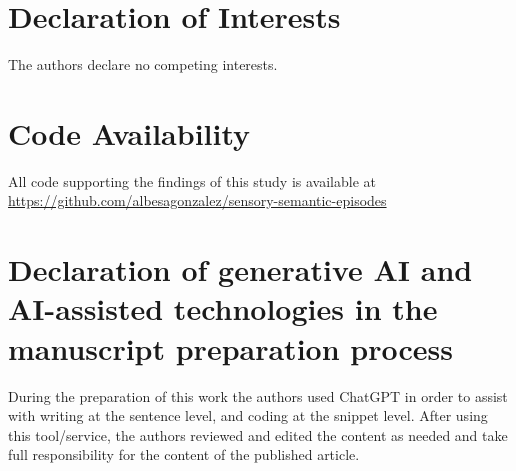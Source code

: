 \documentclass{article}
\begin{document}
\section*{Declaration of Interests}
The authors declare no competing interests.
\section*{Code Availability}
All code supporting the findings of this study is available at 
\url{https://github.com/albesagonzalez/sensory-semantic-episodes}
\section*{Declaration of generative AI and AI-assisted technologies in the manuscript preparation process}
During the preparation of this work the authors used ChatGPT in order to assist with writing at the sentence level, and coding at the snippet level. After using this tool/service, the authors reviewed and edited the content as needed and take full responsibility for the content of the published article.

\clearpage
\end{document}
